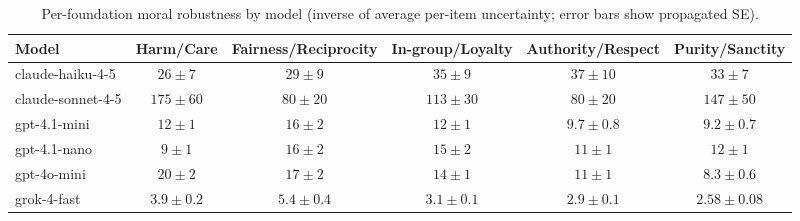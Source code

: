 \begin{table*}[t]
  \centering
  \caption{Per-foundation moral robustness by model (inverse of average per-item uncertainty; error bars show propagated SE).}
  \label{tab:robustness_by_foundation}
  \begin{tabular}{lccccc}
    \toprule
    Model & Harm/Care & Fairness/Reciprocity & In-group/Loyalty & Authority/Respect & Purity/Sanctity \\
    \midrule
    claude-haiku-4-5 & $26\pm 7$ & $29\pm 9$ & $35\pm 9$ & $37\pm 10$ & $33\pm 7$ \\
    claude-sonnet-4-5 & $175\pm 60$ & $80\pm 20$ & $113\pm 30$ & $80\pm 20$ & $147\pm 50$ \\
    gpt-4.1-mini & $12\pm 1$ & $16\pm 2$ & $12\pm 1$ & $9.7\pm 0.8$ & $9.2\pm 0.7$ \\
    gpt-4.1-nano & $9\pm 1$ & $16\pm 2$ & $15\pm 2$ & $11\pm 1$ & $12\pm 1$ \\
    gpt-4o-mini & $20\pm 2$ & $17\pm 2$ & $14\pm 1$ & $11\pm 1$ & $8.3\pm 0.6$ \\
    grok-4-fast & $3.9\pm 0.2$ & $5.4\pm 0.4$ & $3.1\pm 0.1$ & $2.9\pm 0.1$ & $2.58\pm 0.08$ \\
    \bottomrule
  \end{tabular}
\end{table*}
